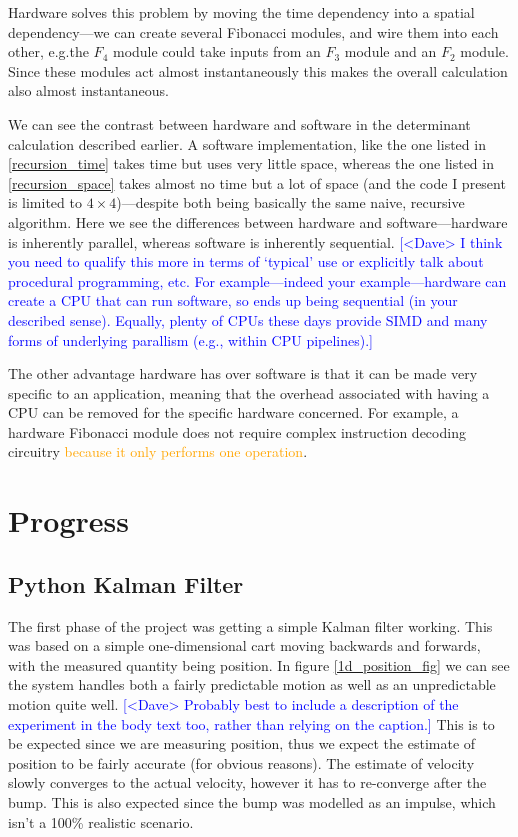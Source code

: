 \documentclass[12pt]{article}
\newcommand{\note}[2][red]{\textcolor{#1}{#2}}
\newcommand{\notedme}[1]{\note[blue]{[<Dave> #1]}}
\newcommand{\change}[2][]{\textcolor{orange}{#2}}
\begin{document}
Hardware solves this problem by moving the time dependency into a spatial dependency---we can create several Fibonacci modules, and wire them into each other, e.g.\@ the $F_4$ module could take inputs from an $F_3$ module and an $F_2$ module. Since these modules act almost instantaneously this makes the overall calculation also almost instantaneous.

We can see the contrast between hardware and software in the determinant calculation described earlier. A software implementation, like the one listed in \ref{recursion_time} takes time but uses very little space, whereas the one listed in \ref{recursion_space} takes almost no time but a lot of space (and the code I present is limited to $4\times4$)---despite both being basically the same naive, recursive algorithm. Here we see the differences between hardware and software---hardware is inherently parallel, whereas software is inherently sequential.
\notedme{I think you need to qualify this more in terms of `typical' use or explicitly talk about procedural programming, etc. For example---indeed your example---hardware can create a CPU that can run software, so ends up being sequential (in your described sense). Equally, plenty of CPUs these days provide SIMD and many forms of underlying parallism (e.g., within CPU pipelines).}

The other advantage hardware has over software is that it can be made very specific to an application, meaning that the overhead associated with having a CPU can be removed for the specific hardware concerned. For example, a hardware Fibonacci module does not require complex instruction decoding circuitry \change{because it only performs one operation}.

\section{Progress}

\subsection{Python Kalman Filter}

The first phase of the project was getting a simple Kalman filter working. This was based on a simple one-dimensional cart moving backwards and forwards, with the measured quantity being position. In figure \ref{1d_position_fig} we can see the system handles both a fairly predictable motion as well as an unpredictable motion quite well. 
\notedme{Probably best to include a description of the experiment in the body text too, rather than relying on the caption.}
This is to be expected since we are measuring position, thus we expect the estimate of position to be fairly accurate (for obvious reasons). The estimate of velocity slowly converges to the actual velocity, however it has to re-converge after the bump. This is also expected since the bump was modelled as an impulse, which isn't a 100\% realistic scenario.
\end{document}
